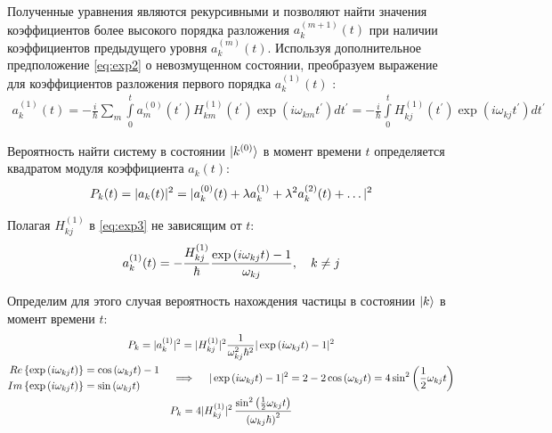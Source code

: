 \documentclass[12pt]{article}
\newcommand{\lb}{\left(}
\newcommand{\rb}{\right)}
\begin{document}
Полученные уравнения являются рекурсивными и позволяют найти значения коэффициентов более высокого порядка разложения $a_k^{(m + 1)}(t)$ при наличии коэффициентов предыдущего уровня $a_k^{(m)}(t)$. Используя дополнительное предположение \eqref{eq:exp2} о невозмущенном состоянии, преобразуем выражение для коэффициентов разложения первого порядка $a_k^{(1)}(t)$ :
\begin{gather}
	a_k^{(1)}(t) = - \frac{i}{\hbar} \sum_m \int\limits_{0}^{t} a_m^{(0)} (t^\prime) H_{km}^{(1)} (t^\prime) \exp \lb i \omega_{km} t^\prime \rb d t^\prime = - \frac{i}{\hbar} \int\limits_0^t H_{kj}^{(1)}(t^\prime) \exp \lb i \omega_{kj} t^\prime \rb d t^\prime \label{eq:exp3}
\end{gather}

Вероятность найти систему в состоянии $\ket{k^{(0)}}$ в момент времени $t$ определяется квадратом модуля коэффициента $a_k(t)$:
\begin{gather}
	P_{k}(t) = | a_k(t) |^2  = | a_k^{(0)}(t) + \lambda a_k^{(1)} + \lambda^2 a_k^{(2)}(t) + \dots |^2 \notag
\end{gather}

Полагая $ H_{kj}^{(1)}$ в \eqref{eq:exp3} не зависящим от $t$:
\begin{gather}
	a_k^{(1)}(t) = - \frac{H_{kj}^{(1)}}{\hbar} \frac{\exp \lb i \omega_{kj} t \rb - 1}{\omega_{kj}}, \quad k \neq j \notag
\end{gather}

Определим для этого случая вероятность нахождения частицы в состоянии $\ket{k}$ в момент времени $t$:
\begin{gather}
	P_k = |a _k^{(1)} |^2 = | H_{kj}^{(1)} |^2 \frac{1}{\omega_{kj}^2 \hbar^2} | \exp \lb i \omega_{kj} t \rb - 1 |^2 \notag \\
	\begin{aligned}
		Re \left\{ \exp \lb i \omega_{kj} t \rb \right\} &= \cos \lb \omega_{kj} t \rb - 1 \\
		Im \left\{ \exp \lb i \omega_{kj} t \rb \right\} &= \sin \lb \omega_{kj} t \rb 
	\end{aligned} \quad \implies \quad
	| \exp \lb i \omega_{kj} t \rb - 1 |^2 = 2 - 2 \cos \lb \omega_{kj} t \rb = 4 \sin^2 \lb \frac{1}{2} \omega_{kj} t \rb \notag \\
	P_k = 4 | H_{kj}^{(1)} |^2  \, \frac{\sin^2 \lb \frac{1}{2} \omega_{kj} t \rb}{\lb \omega_{kj} \hbar \rb^2} \notag
\end{gather} 
\end{document}
